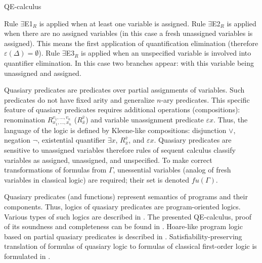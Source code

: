 \begin{entry}{QE-calculus}
\begin{calculus}
\begin{center}
\begin{minipage}[t]{0.90\textwidth}
\raisebox{5pt}{$\exists$E3$_R$} 
\end{minipage}
\end{center}
Rule $\exists$E1$_R$  is applied when at least one variable is assigned.
Rule $\exists$E2$_R$ is applied when there are no assigned variables (in this
case a fresh unassigned variables is assigned). This means  the first
application of quantification elimination (therefore $\varepsilon
(\Delta)=\emptyset$).  Rule $\exists$E3$_R$ is applied when an unspecified
variable is involved into quantifier elimination. In this case two branches
appear:  with this variable being unassigned and assigned.  

\end{calculus}


\begin{clarifications}
  Quasiary predicates are predicates over partial assignments of variables. Such
  predicates do not have fixed arity and generalize $n$-ary predicates. This
  specific feature of quasiary predicates requires additional operations
  (compositions): renomination $R_{x_{1} ,...,x_{n} }^{v_{1} ,...,v_{n} }$
  ($R^{\bar v}_{\bar x}$) and  variable unassignment  predicate $\varepsilon x$.
  Thus, the language of the logic is defined by Kleene-like compositions:
  disjunction $\vee$, negation $\neg$, existential quantifier $\exists x$,
  $R^{\bar v}_{\bar x}$, and $\varepsilon x$. Quasiary predicates are sensitive to
  unassigned variables therefore rules of sequent calculus classify variables as
  assigned, unassigned, and unspecified. To make correct transformations of
  formulas from $\Gamma$, unessential variables (analog of fresh variables in
  classical logic) are required; their set is denoted $fu(\Gamma)$.      
\end{clarifications}

\begin{history}
  Quasiary predicates (and functions) represent semantics of programs and their
  components.  Thus, logics of quasiary predicates are program-oriented logics.
  Various types of such logics are described in \cite{NikShk2008,NikShk2013}. The
  presented QE-calculus, proof of its soundness and completeness can be found in
  \cite{NikShk2017}. Hoare-like program logic based on partial quasiary predicates
  is described in \cite{KNS2013}. Satisfiability-preserving translation of
  formulas of quasiary logic to formulas of classical first-order logic is
  formulated in \cite{NikTym2012}.
\end{history}


\end{entry}
